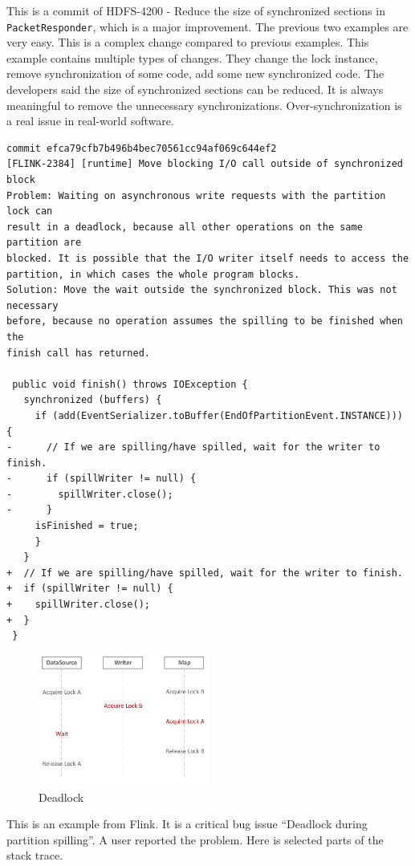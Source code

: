 \documentclass[conference]{IEEEtran}
\begin{document}
This is a commit of HDFS-4200 - Reduce the size of synchronized sections in \texttt{PacketResponder}, which is a major improvement. The previous two examples are very easy. This is a complex change compared to previous examples. This example contains multiple types of changes. They change the lock instance, remove synchronization of some code, add some new synchronized code. The developers said the size of synchronized sections can be reduced. It is always meaningful to remove the unnecessary synchronizations. Over-synchronization \cite{conf/sigsoft/GuJSZL15} is a real issue in real-world software.

\begin{lstlisting}
commit efca79cfb7b496b4bec70561cc94af069c644ef2
[FLINK-2384] [runtime] Move blocking I/O call outside of synchronized block
Problem: Waiting on asynchronous write requests with the partition lock can
result in a deadlock, because all other operations on the same partition are
blocked. It is possible that the I/O writer itself needs to access the
partition, in which cases the whole program blocks.
Solution: Move the wait outside the synchronized block. This was not necessary
before, because no operation assumes the spilling to be finished when the
finish call has returned.

 public void finish() throws IOException {
   synchronized (buffers) {
     if (add(EventSerializer.toBuffer(EndOfPartitionEvent.INSTANCE))) {
-      // If we are spilling/have spilled, wait for the writer to finish.
-      if (spillWriter != null) {
-        spillWriter.close();
-      }
     isFinished = true;
     }
   }
+  // If we are spilling/have spilled, wait for the writer to finish.
+  if (spillWriter != null) {
+    spillWriter.close();
+  }
 }
\end{lstlisting}

\begin{figure}
	\centering
	\includegraphics[height=1.7in]{deadlock}
	\caption{Deadlock}
\end{figure}

This is an example from Flink. It is a critical bug issue ``Deadlock during partition spilling''. A user reported the problem. Here is selected parts of the stack trace.
\end{document}
